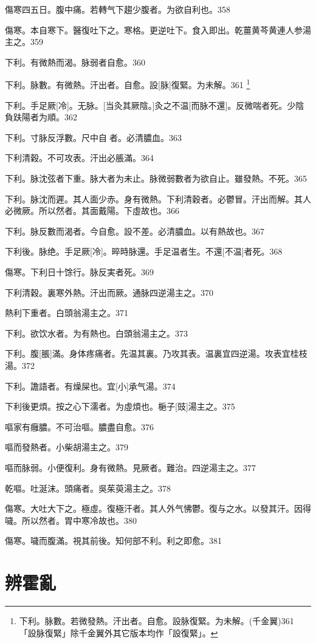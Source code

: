 \documentclass[oneside,b4paper]{ctexbook}
\begin{document}
\begin{flushleft}
傷寒四五日。腹中痛。若轉气下趨少腹者。为欲自利也。358

傷寒。本自寒下。醫復吐下之。寒格。更逆吐下。食入即出。乾薑黄芩黄連人参湯主之。359

下利。有微熱而渴。脉弱者自愈。360

下利。脉數。有微熱。汗出者。自愈。設[脉]復緊。为未解。361
\footnote{下利。脉數。若微發熱。汗出者。自愈。設脉復緊。为未解。(千金翼)361\\「設脉復緊」除千金翼外其它版本均作「設復緊」。}

下利。手足厥[冷]。无脉。[当灸其厥陰。]灸之不温[而脉不還]。反微喘者死。少陰負趺陽者为順。362

下利。寸脉反浮數。尺中自{𬈧}者。必清膿血。363

下利清穀。不可攻表。汗出必脹滿。364

下利。脉沈弦者下重。脉大者为未止。脉微弱數者为欲自止。雖發熱。不死。365

下利。脉沈而遲。其人面少赤。身有微熱。下利清穀者。必鬱冒。汗出而解。其人必微厥。所以然者。其面戴陽。下虛故也。366

下利。脉反數而渴者。今自愈。設不差。必清膿血。以有熱故也。367

下利後。脉绝。手足厥[冷]。晬時脉還。手足温者生。不還[不温]者死。368

傷寒。下利日十馀行。脉反実者死。369

下利清穀。裏寒外熱。汗出而厥。通脉四逆湯主之。370

熱利下重者。白頭翁湯主之。371

下利。欲饮水者。为有熱也。白頭翁湯主之。373

下利。腹[脹]滿。身体疼痛者。先温其裏。乃攻其表。温裏宜四逆湯。攻表宜桂枝湯。372

下利。譫語者。有燥屎也。宜[小]承气湯。374

下利後更煩。按之心下濡者。为虛煩也。梔子[豉]湯主之。375

嘔家有癰膿。不可治嘔。膿盡自愈。376

嘔而發熱者。小柴胡湯主之。379

嘔而脉弱。小便復利。身有微熱。見厥者。難治。四逆湯主之。377

乾嘔。吐涎沫。頭痛者。吳茱萸湯主之。378

傷寒。大吐大下之。極虛。復極汗者。其人外气怫鬱。復与之水。以發其汗。因得噦。所以然者。胃中寒冷故也。380

傷寒。噦而腹滿。視其前後。知何部不利。利之即愈。381

\chapter{辨霍亂}


\end{flushleft}
\end{document}
